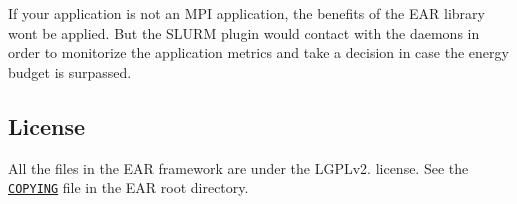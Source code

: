 If your application is not an M\+PI application, the benefits of the E\+AR library won\textquotesingle{}t be applied. But the S\+L\+U\+RM plugin would contact with the daemons in order to monitorize the application metrics and take a decision in case the energy budget is surpassed.

\subsection*{License }

All the files in the E\+AR framework are under the L\+G\+P\+Lv2. license. See the \href{../../COPYING}{\tt C\+O\+P\+Y\+I\+NG} file in the E\+AR root directory. 